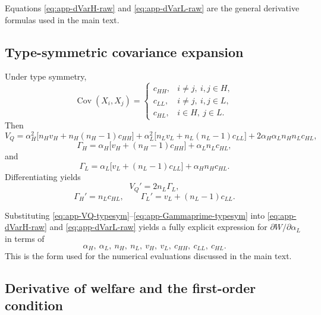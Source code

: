 \documentclass[a4paper,12pt]{article}
\theoremstyle{definition}
\theoremstyle{remark}
\DeclareMathOperator{\Cov}{Cov}
\newcommand{\1}{\mathbf{1}}
\begin{document}
Equations \eqref{eq:app-dVarH-raw} and \eqref{eq:app-dVarL-raw} are the general
derivative formulas used in the main text.

\subsection{Type-symmetric covariance expansion}
\label{app:alphaL-typesym}

Under type symmetry,
\[
\Cov(X_i,X_j)=
\begin{cases}
c_{HH}, & i\neq j,\ i,j\in H,\\
c_{LL}, & i\neq j,\ i,j\in L,\\
c_{HL}, & i\in H,\ j\in L.
\end{cases}
\]
Then
\begin{equation}
V_Q
=
\alpha_H^2\bigl[n_Hv_H+n_H(n_H-1)c_{HH}\bigr]
+
\alpha_L^2\bigl[n_Lv_L+n_L(n_L-1)c_{LL}\bigr]
+
2\alpha_H\alpha_Ln_Hn_Lc_{HL},
\label{eq:app-VQ-typesym}
\end{equation}
\begin{equation}
\Gamma_H
=
\alpha_H\bigl[v_H+(n_H-1)c_{HH}\bigr]
+
\alpha_Ln_Lc_{HL},
\label{eq:app-GammaH-typesym}
\end{equation}
and
\begin{equation}
\Gamma_L
=
\alpha_L\bigl[v_L+(n_L-1)c_{LL}\bigr]
+
\alpha_Hn_Hc_{HL}.
\label{eq:app-GammaL-typesym}
\end{equation}
Differentiating yields
\begin{equation}
V_Q'=2n_L\Gamma_L,
\label{eq:app-VQprime-typesym}
\end{equation}
\begin{equation}
\Gamma_H'=n_Lc_{HL},
\qquad
\Gamma_L'=v_L+(n_L-1)c_{LL}.
\label{eq:app-Gammaprime-typesym}
\end{equation}

Substituting
\eqref{eq:app-VQ-typesym}--\eqref{eq:app-Gammaprime-typesym} into
\eqref{eq:app-dVarH-raw} and \eqref{eq:app-dVarL-raw} yields a fully explicit
expression for \(\partial W/\partial\alpha_L\) in terms of
\[
\alpha_H,\ \alpha_L,\ n_H,\ n_L,\ v_H,\ v_L,\ c_{HH},\ c_{LL},\ c_{HL}.
\]
This is the form used for the numerical evaluations discussed in the main text.

\subsection{Derivative of welfare and the first-order condition}
\label{app:alphaL-welfare}
\end{document}
